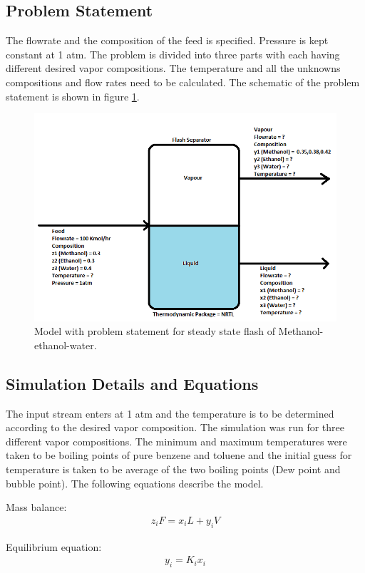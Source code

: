 \documentclass[12pt]{report}
\begin{document}
\subsection{Problem Statement}
The flowrate and the composition of the feed is specified. Pressure is kept constant at 1 atm. The problem is divided into three parts with each having different desired vapor compositions. The temperature and all the unknowns compositions and flow rates need to be calculated. The schematic of the problem statement is shown in figure \ref{Flash}.

\begin{figure}
\centering
\includegraphics[width=0.8\linewidth]{Flash}
\caption{Model with problem statement for steady state flash of Methanol-ethanol-water.}
\label{Flash}
\end{figure}


\subsection{Simulation Details and Equations}
The input stream enters at 1 atm and the temperature is to be determined according to the desired vapor composition. The simulation was run for three different vapor compositions. The minimum and maximum temperatures were taken to be boiling points of pure benzene and toluene and the initial guess for temperature is taken to be average of the two boiling points (Dew point and bubble point). The following equations describe the model.

Mass balance: \\
\begin{gather*}
z_iF = x_iL + y_iV
\end{gather*}

Equilibrium equation: \\
\begin{gather*}
y_i = K_ix_i 
\end{gather*}
\end{document}
